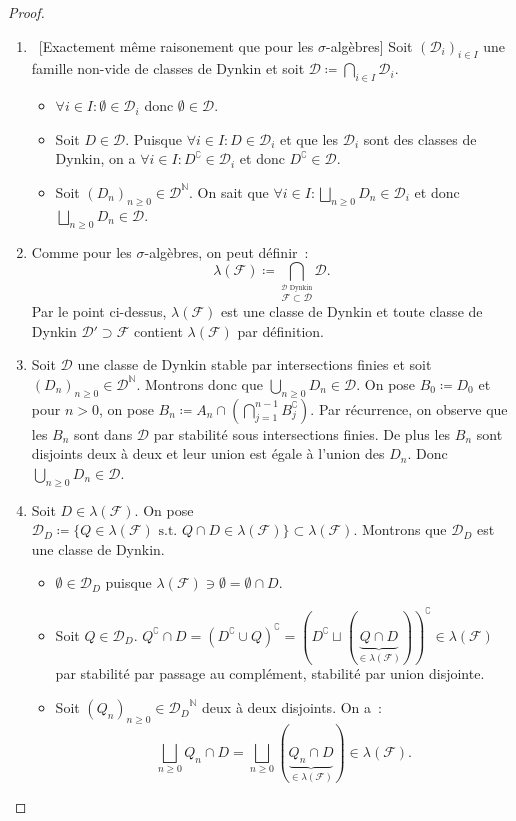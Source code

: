 \documentclass{article}
\newcommand{\st}{\text{ s.t. }}
\newcommand{\C}{\complement}
\newcommand{\N}{{\mathbb N}}
\begin{document}
\begin{proof}~
\begin{enumerate}
	\item~[Exactement même raisonement que pour les $\sigma$-algèbres] Soit $(\mathcal D_i)_{i \in I}$ une famille non-vide de classes de Dynkin et soit
	$\mathcal D \coloneqq \bigcap_{i \in I}\mathcal D_i$.

	\begin{itemize}
		\item $\forall i \in I : \emptyset \in \mathcal D_i$ donc $\emptyset \in \mathcal D$.
		\item Soit $D \in \mathcal D$. Puisque $\forall i \in I : D \in \mathcal D_i$ et que les $\mathcal D_i$ sont des classes de Dynkin, on a $\forall i \in I : D^\C \in \mathcal D_i$
		et donc $D^\C \in \mathcal D$.
		\item Soit $(D_n)_{n \geq 0} \in \mathcal D^\N$. On sait que $\forall i \in I : \bigsqcup_{n \geq 0}D_n \in \mathcal D_i$ et donc $\bigsqcup_{n \geq 0}D_n \in \mathcal D$.
	\end{itemize}

	\item Comme pour les $\sigma$-algèbres, on peut définir~:
	\[\lambda(\mathcal F) \coloneqq \bigcap_{\overset{\mathcal D \text{ Dynkin}}{\mathcal F \subset \mathcal D}}\mathcal D.\]
	Par le point ci-dessus, $\lambda(\mathcal F)$ est une classe de Dynkin et toute classe de Dynkin $\mathcal D' \supset \mathcal F$ contient $\lambda(\mathcal F)$ par définition.

	\item Soit $\mathcal D$ une classe de Dynkin stable par intersections finies et soit $(D_n)_{n \geq 0} \in \mathcal D^\N$. Montrons donc que $\bigcup_{n \geq 0}D_n \in \mathcal D$.
	On pose $B_0 \coloneqq D_0$ et pour $n > 0$, on pose $B_n \coloneqq A_n \cap (\bigcap_{j=1}^{n-1}B_j^\C)$. Par récurrence, on observe que les $B_n$ sont dans $\mathcal D$ par
	stabilité sous intersections finies. De plus les $B_n$ sont disjoints deux à deux et leur union est égale à l'union des $D_n$. Donc $\bigcup_{n \geq 0}D_n \in \mathcal D$.

	\item Soit $D \in \lambda(\mathcal F)$. On pose $\mathcal D_D \coloneqq \{Q \in \lambda(\mathcal F) \st Q \cap D \in \lambda(\mathcal F)\} \subset \lambda(\mathcal F)$.
	Montrons que $\mathcal D_D$ est une classe de Dynkin.
	\begin{itemize}
		\item $\emptyset \in \mathcal D_D$ puisque $\lambda(\mathcal F) \ni \emptyset = \emptyset \cap D$.
		\item Soit $Q \in \mathcal D_D$. $Q^\C \cap D = (D^\C \cup Q)^\C = (D^\C \sqcup (\underbrace {Q \cap D}_{\in \lambda(\mathcal F)}))^\C \in \lambda(\mathcal F)$ par
		stabilité par passage au complément, stabilité par union disjointe.
		\item Soit $(Q_n)_{n \geq 0} \in {\mathcal D_D}^\N$ deux à deux disjoints. On a~:
		\[\bigsqcup_{n \geq 0}Q_n \cap D = \bigsqcup_{n \geq 0}(\underbrace {Q_n \cap D}_{\in \lambda(\mathcal F)}) \in \lambda(\mathcal F).\]
	\end{itemize}


\end{enumerate}
\end{proof}
\end{document}
